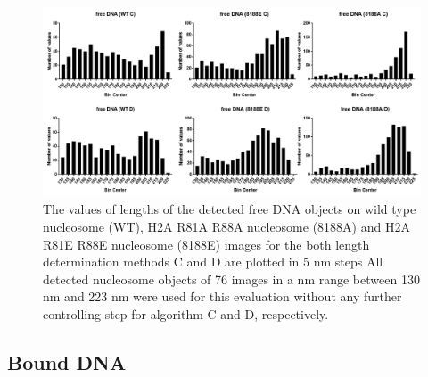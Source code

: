 \documentclass{article}
\begin{document}
%
\begin{figure}[!htb]
	\begin{center}
		\includegraphics[width = 1\textwidth]{hfree_DNA}
	\end{center}
	\caption{ The values of lengths of the detected free DNA objects on wild type nucleosome (WT), H2A R81A R88A nucleosome (8188A) and H2A R81E R88E nucleosome (8188E) images for the both length determination methods C and D are plotted in 5 nm steps All detected nucleosome objects of 76 images in a nm range between 130 nm and 223 nm were used for this evaluation without any further controlling step for algorithm C and D, respectively.}
	\label{fig:hfree DNA} %
\end{figure}

\subsection{Bound DNA}\label{sec: Bound DNA}
\end{document}
